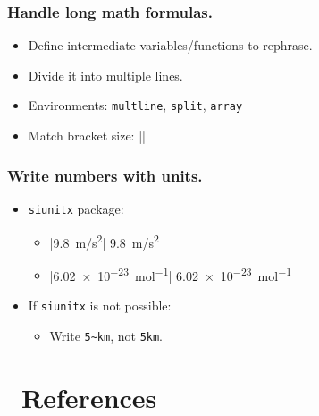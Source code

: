 \documentclass[CJKchecksingle]{beamer}
\newcommand{\env}[1]{\lstinline|#1|}
\newcommand{\pkg}[1]{\texttt{#1}}
\newcommand{\BibTeX}{\hologo{BibTeX}}
\begin{document}
\begin{frame}[fragile]\frametitle{Handle long math formulas.}

\begin{itemize}
\item
  Define intermediate variables/functions to rephrase.
\item
  Divide it into multiple lines.
\item
  Environments: \env{multline}, \env{split}, \env{array}
\item
  Match bracket size: |\vphantom|
\end{itemize}

\end{frame}

\begin{frame}[fragile]\frametitle{Write numbers with units.}

\begin{itemize}
\item
  \pkg{siunitx} package:
  \begin{itemize}
    \item |\SI{9.8}{m/s^2}| \SI{9.8}{m/s^2}
    \item |\SI{6.02e-23}{mol^{-1}}| \SI{6.02e-23}{mol^{-1}}
  \end{itemize}
\item
  If \pkg{siunitx} is not possible:
  \begin{itemize}
    \item Write \lstinline{5~km}, not \lstinline{5km}.\nocite{commonerrors}
  \end{itemize}
\end{itemize}

\end{frame}

\section{\BibTeX\ References}
\end{document}
